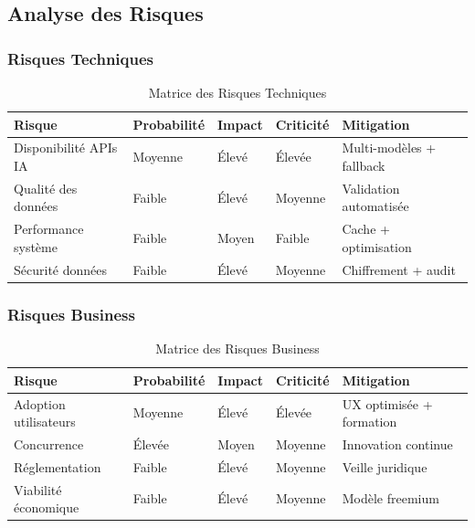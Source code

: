 \subsection{Analyse des Risques}
\label{subsec:analyse_risques}

\subsubsection{Risques Techniques}

\begin{table}[H]
\centering
\caption{Matrice des Risques Techniques}
\begin{tabular}{|l|l|l|l|l|}
\hline
\textbf{Risque} & \textbf{Probabilité} & \textbf{Impact} & \textbf{Criticité} & \textbf{Mitigation} \\
\hline
Disponibilité APIs IA & Moyenne & Élevé & Élevée & Multi-modèles + fallback \\
\hline
Qualité des données & Faible & Élevé & Moyenne & Validation automatisée \\
\hline
Performance système & Faible & Moyen & Faible & Cache + optimisation \\
\hline
Sécurité données & Faible & Élevé & Moyenne & Chiffrement + audit \\
\hline
\end{tabular}
\label{tab:risques_techniques}
\end{table}

\subsubsection{Risques Business}

\begin{table}[H]
\centering
\caption{Matrice des Risques Business}
\begin{tabular}{|l|l|l|l|l|}
\hline
\textbf{Risque} & \textbf{Probabilité} & \textbf{Impact} & \textbf{Criticité} & \textbf{Mitigation} \\
\hline
Adoption utilisateurs & Moyenne & Élevé & Élevée & UX optimisée + formation \\
\hline
Concurrence & Élevée & Moyen & Moyenne & Innovation continue \\
\hline
Réglementation & Faible & Élevé & Moyenne & Veille juridique \\
\hline
Viabilité économique & Faible & Élevé & Moyenne & Modèle freemium \\
\hline
\end{tabular}
\label{tab:risques_business}
\end{table}

